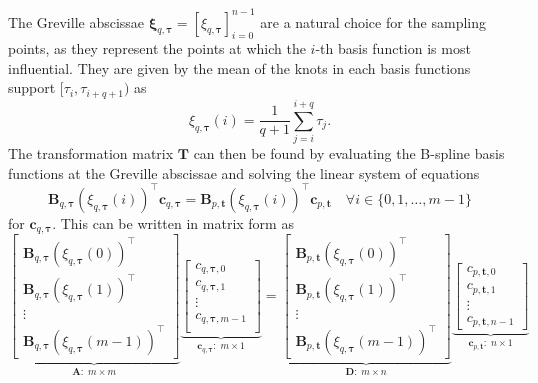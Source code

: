 The Greville abscissae $\boldsymbol \xi_{q,\boldsymbol \tau}=[\xi_{q,\boldsymbol \tau}]_{i=0}^{n-1}$ are a natural choice for the sampling points, as they represent the points at which the $i$-th basis function is most influential. 
They are given by the mean of the knots in each basis functions support $[\tau_i, \tau_{i+q+1})$ as
\begin{equation}\label{eq:greville-abscissae}
    \xi_{q,\boldsymbol \tau}(i) = \frac{1}{q+1} \sum_{j=i}^{i+q} \tau_j.
\end{equation}
The transformation matrix $\mathbf T$ can then be found by evaluating the B-spline basis functions at the Greville abscissae and solving the linear system of equations
\begin{equation}\label{eq:transformation-matrix-equation}
    \mathbf B_{q,\boldsymbol \tau}(\xi_{q,\boldsymbol \tau}(i))^\top \mathbf c_{q, \boldsymbol \tau} = \mathbf B_{p,\mathbf t}(\xi_{q,\boldsymbol \tau}(i))^\top \mathbf c_{p, \mathbf t} \quad \forall i\in\{0,1,\ldots,m-1\}
\end{equation}
for $\mathbf c_{q, \boldsymbol \tau}$. This can be written in matrix form as
\begin{equation}\label{eq:transformation-matrix}
    \underbrace{\begin{bmatrix}
        \mathbf B_{q,\boldsymbol \tau}(\xi_{q,\boldsymbol \tau}(0))^\top \\
        \mathbf B_{q,\boldsymbol \tau}(\xi_{q,\boldsymbol \tau}(1))^\top \\
        \vdots                                                             \\
        \mathbf B_{q,\boldsymbol \tau}(\xi_{q,\boldsymbol \tau}(m-1))^\top
    \end{bmatrix}}_{\mathbf A:\;m \times m}
    \underbrace{\begin{bmatrix}
        c_{q, \boldsymbol \tau, 0}   \\
        c_{q, \boldsymbol \tau, 1}   \\
        \vdots                       \\
        c_{q, \boldsymbol \tau, m-1} \\
    \end{bmatrix}}_{\mathbf c_{q,\boldsymbol\tau}:\;m \times 1}
    = 
    \underbrace{\begin{bmatrix}
        \mathbf B_{p,\mathbf t}(\xi_{q,\boldsymbol \tau}(0))^\top  \\
        \mathbf B_{p,\mathbf t}(\xi_{q,\boldsymbol \tau}(1))^\top  \\
        \vdots                                                       \\
        \mathbf B_{p,\mathbf t}(\xi_{q,\boldsymbol \tau}(m-1))^\top
    \end{bmatrix}}_{\mathbf D:\;m \times n}
    \underbrace{\begin{bmatrix}
        c_{p, \mathbf t, 0}   \\
        c_{p, \mathbf t, 1}   \\
        \vdots                \\
        c_{p, \mathbf t, n-1}
    \end{bmatrix}}_{\mathbf c_{p,\mathbf t}:\;n \times 1}
\end{equation}
